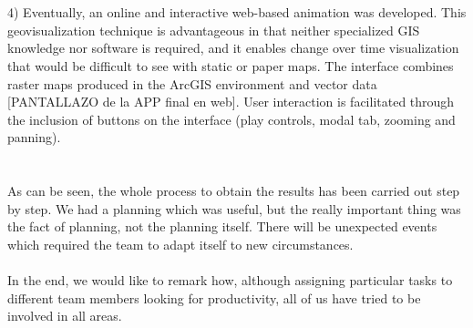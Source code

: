 \\
\\
4) Eventually, an online and interactive web-based animation was developed. This geovisualization technique is advantageous in that neither specialized GIS knowledge nor software is required, and it enables change over time visualization that would be difficult to see with static or paper maps. The interface combines raster maps produced in the ArcGIS environment and vector data [PANTALLAZO de la APP final en web]. User interaction is facilitated through the inclusion of buttons on the interface (play controls, modal tab, zooming and panning).
\\
\\
\\
As can be seen, the whole process to obtain the results has been carried out step by step. We had a planning which was useful, but the really important thing was the fact of planning, not the planning itself. There will be unexpected events which required the team to adapt itself to new circumstances.
\\
\\
In the end, we would like to remark how, although assigning particular tasks to different team members looking for productivity, all of us have tried to be involved in all areas.
\\
\\